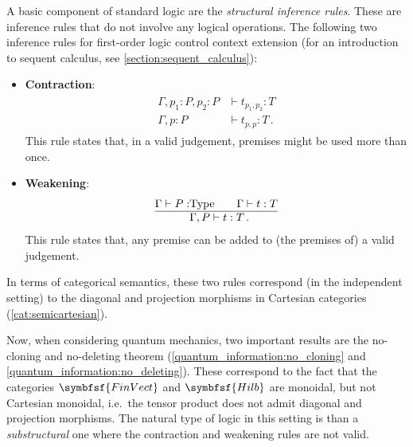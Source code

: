    A basic component of standard logic are the \textit{structural inference rules}. These are inference rules that do not involve any logical operations. The following two inference rules for first-order logic control context extension (for an introduction to sequent calculus, see \cref{section:sequent_calculus}):
    \begin{itemize}
        \item\textbf{Contraction}:
        \begin{gather}
            \begin{aligned}
                \Gamma,p_1:P,p_2:P &\vdash t_{p_1,p_2}:T\\
                \hline
                \Gamma,p:P &\vdash t_{p,p}:T\,.
            \end{aligned}
        \end{gather}
        This rule states that, in a valid judgement, premises might be used more than once.
        \item\textbf{Weakening}:
        \begin{gather}
            \begin{aligned}
                \Gamma\vdash P:&\mathrm{Type}\qquad\Gamma\vdash t:T\\
                \hline
                &\Gamma,P\vdash t:T\,.
            \end{aligned}
        \end{gather}
        This rule states that, any premise can be added to (the premises of) a valid judgement.
    \end{itemize}
    In terms of categorical semantics, these two rules correspond (in the independent setting) to the diagonal and projection morphisms in Cartesian categories (\cref{cat:semicartesian}).

    Now, when considering quantum mechanics, two important results are the no-cloning and no-deleting theorem (\cref{quantum_information:no_cloning} and \cref{quantum_information:no_deleting}). These correspond to the fact that the categories $\symbfsf{FinVect}$ and $\symbfsf{Hilb}$ are monoidal, but not Cartesian monoidal, i.e.~the tensor product does not admit diagonal and projection morphisms. The natural type of logic in this setting is than a \textit{substructural} one where the contraction and weakening rules are not valid.

